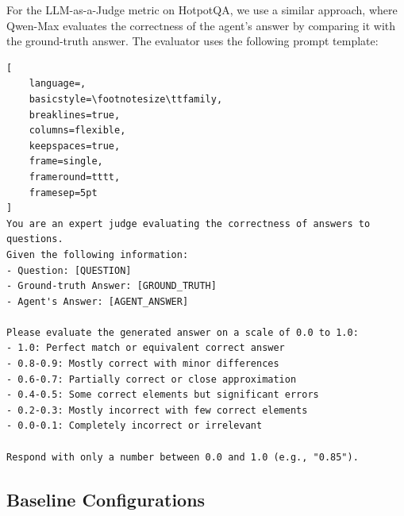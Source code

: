 For the LLM-as-a-Judge metric on HotpotQA, we use a similar approach, where Qwen-Max evaluates the correctness of the agent's answer by comparing it with the ground-truth answer. The evaluator uses the following prompt template:

\begin{lstlisting}[
    language=,
    basicstyle=\footnotesize\ttfamily,
    breaklines=true,
    columns=flexible,
    keepspaces=true,
    frame=single,
    frameround=tttt,
    framesep=5pt
]
You are an expert judge evaluating the correctness of answers to questions. 
Given the following information:
- Question: [QUESTION]
- Ground-truth Answer: [GROUND_TRUTH]
- Agent's Answer: [AGENT_ANSWER]

Please evaluate the generated answer on a scale of 0.0 to 1.0:
- 1.0: Perfect match or equivalent correct answer
- 0.8-0.9: Mostly correct with minor differences
- 0.6-0.7: Partially correct or close approximation
- 0.4-0.5: Some correct elements but significant errors
- 0.2-0.3: Mostly incorrect with few correct elements
- 0.0-0.1: Completely incorrect or irrelevant

Respond with only a number between 0.0 and 1.0 (e.g., "0.85").
\end{lstlisting}

\subsection{Baseline Configurations}
\label{app:baselines}

